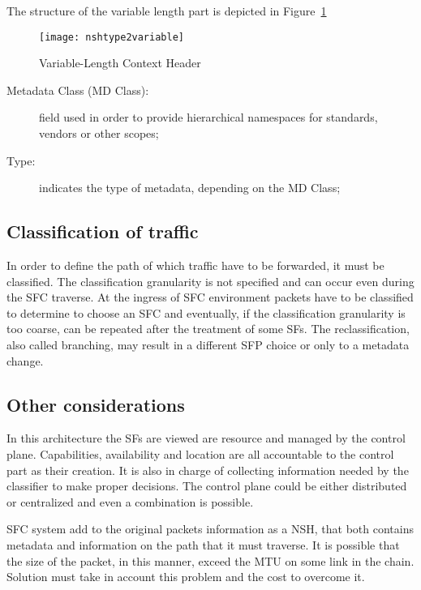 The structure of the variable length part is depicted in
Figure~\ref{chap:background:img:nshtype2variable}

\begin{figure}[H]
  \centering
  \texttt{[image: nshtype2variable]}
  \caption[Variable-Length Context Header]{Variable-Length Context
    Header~\cite{rfc8300}}
  \label{chap:background:img:nshtype2variable}
\end{figure}

\begin{description}
  \item[Metadata Class (MD Class):] field used in order to provide hierarchical
  namespaces for standards, vendors or other scopes;
  \item[Type:] indicates the type of metadata, depending on the MD Class;
\end{description}


\subsection{Classification of traffic}
In order to define the path of which traffic have to be forwarded, it must be
classified. The classification granularity is not specified and can occur even
during the SFC traverse. At the ingress of SFC environment packets have to be
classified to determine to choose an SFC and eventually, if the classification
granularity is too coarse, can be repeated after the treatment of some SFs. The
reclassification, also called branching, may result in a different SFP choice or
only to a metadata change.

\subsection{Other considerations}
In this architecture the SFs are viewed are resource and managed by the control
plane. Capabilities, availability and location are all accountable to the
control part as their creation. It is also in charge of collecting information
needed by the classifier to make proper decisions. The control plane could be
either distributed or centralized and even a combination is possible. 

SFC system add to the original packets information as a NSH, that both contains
metadata and information on the path that it must traverse. It is possible that
the size of the packet, in this manner, exceed the MTU on some link in the
chain. Solution must take in account this problem and the cost to overcome it.

